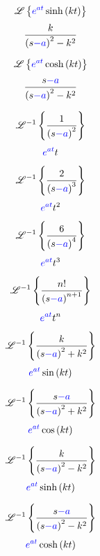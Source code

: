 \documentclass[grid, poker_landscape]{flashcards}
\newcommand{\Lap}{\ensuremath{\mathscr{L}}}
\newcommand{\invLap}{\ensuremath{\mathscr{L}^{-1}}}
\begin{document}
  \begin{flashcard}{ \[ \Lap\left\{ 
      {\color{blue}e^{at}} \sinh \left( kt \right)
    \right\} \] }
    \[
      \frac{k}{\left( s {\color{blue}-a} \right)^{2} - k^{2}}
    \]
  \end{flashcard}

  \begin{flashcard}{ \[ \Lap\left\{
      {\color{blue}e^{at}} \cosh \left( kt \right)
    \right\} \] }
    \[
      \frac{s{\color{blue}-a}}{\left( s {\color{blue}-a} \right)^{2} - k^{2}}
    \]
  \end{flashcard}
  
  \begin{flashcard}{ \[ \invLap\left\{
      \frac{1}{\left(s{\color{blue}-a}\right)^{2}}
    \right\} \] }
    \[
      {\color{blue}e^{at}}t
    \]
  \end{flashcard}

  \begin{flashcard}{ \[ \invLap\left\{
      \frac{2}{\left(s{\color{blue}-a}\right)^{3}}
    \right\} \] }
    \[
      {\color{blue}e^{at}}t^{2}
    \]
  \end{flashcard}

  \begin{flashcard}{ \[ \invLap\left\{
      \frac{6}{\left(s{\color{blue}-a}\right)^{4}}
    \right\} \] }
    \[
      {\color{blue}e^{at}}t^{3}
    \]
  \end{flashcard}

  \begin{flashcard}{ \[ \invLap\left\{
      \frac{n!}{\left(s{\color{blue}-a}\right)^{n+1}}
    \right\} \] }
    \[
      {\color{blue}e^{at}}t^{n}
    \]
  \end{flashcard}

  \begin{flashcard}{ \[ \invLap\left\{
      \frac{k}{\left(s{\color{blue}-a}\right)^{2}+k^{2}}
    \right\} \] }
    \[
      {\color{blue}e^{at}}\sin\left(kt\right)
    \]
  \end{flashcard}

  \begin{flashcard}{ \[ \invLap\left\{
    \frac{s{\color{blue}-a}}{\left(s{\color{blue}-a}\right)^{2}+k^{2}}
    \right\} \] }
    \[
      {\color{blue}e^{at}}\cos\left(kt\right)
    \]
  \end{flashcard}

  \begin{flashcard}{ \[ \invLap\left\{
    \frac{k}{\left(s{\color{blue}-a}\right)^{2}-k^{2}}
    \right\} \] }
    \[
      {\color{blue}e^{at}}\sinh\left(kt\right)
    \]
  \end{flashcard}

  \begin{flashcard}{ \[ \invLap\left\{
    \frac{s{\color{blue}-a}}{\left(s{\color{blue}-a}\right)^{2}-k^{2}}
    \right\} \] }
    \[
      {\color{blue}e^{at}}\cosh\left(kt\right)
    \]
  \end{flashcard}
\end{document}
